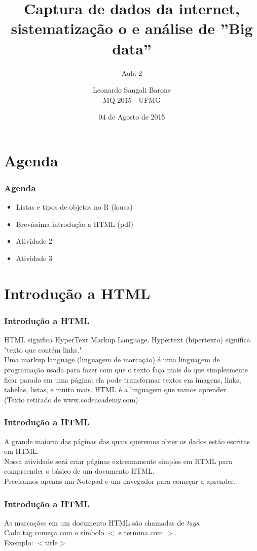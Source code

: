 \documentclass[11pt]{beamer}
\title{Captura de dados da internet, sistematização o e análise de ”Big data”}
\subtitle{Aula 2}
\author[Leonardo Sangali Barone]{Leonardo Sangali Barone\\MQ 2015 - UFMG}
\date[04 de Agosto de 2015]{04 de Agosto de 2015}
\begin{document}
\frame{\titlepage}

\section{Agenda}

\begin{frame}
	\frametitle{Agenda}
	\begin{itemize}
		\item Listas e tipos de objetos no R (lousa)
		\item Brevíssima introdução a HTML (pdf)
		\item Atividade 2
		\item Atividade 3
	\end{itemize}
\end{frame}

\section{Introdução a HTML}

\begin{frame}
	\frametitle{Introdução a HTML}
	HTML significa HyperText Markup Language. Hypertext (hipertexto) significa "texto que contém links."
\newline\\
	Uma markup language (linguagem de marcação) é uma linguagem de programação usada para fazer com que o texto faça mais do que simplesmente ficar parado em uma página: ela pode transformar textos em imagens, links, tabelas, listas, e muito mais. HTML é a linguagem que vamos aprender.	
\newline\\
(Texto retirado de www.codeacademy.com)
\end{frame}

\begin{frame}
	\frametitle{Introdução a HTML}
	A grande maioria das páginas das quais queremos obter os dados estão escritas em HTML.
	\newline\\
	Nossa atividade será criar páginas extremamente simples em HTML para compreender o básico de um documento HTML.
	\newline\\
	Precisamos apenas um Notepad e um navegador para começar a aprender.
\end{frame}

\begin{frame}
	\frametitle{Introdução a HTML}
	As marcações em um documento HTML são chamadas de \emph{tags}.
	\newline\\
	Cada tag começa com o símbolo $<$ e termina com $>$.
	\newline\\
	Exemplo: $<$title$>$
\end{frame}
\end{document}

